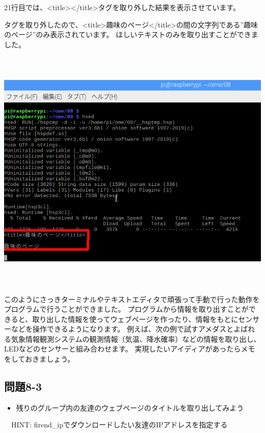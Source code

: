 \documentclass[a4paper,12pt,dvipdfmx]{jarticle}
\begin{document}
\bigskip

21行目では、{\textless}title{\textgreater}{\textless}/title{\textgreater}タグを取り外した結果を表示させています。

タグを取り外したので、{\textless}title{\textgreater}趣味のページ{\textless}/title{\textgreater}の間の文字列である”趣味のページ”のみ表示されています。
ほしいテキストのみを取り出すことができました。



\begin{center}
\includegraphics[width=15.411cm,height=11.841cm]{textbook-img015.png}

\end{center}

\bigskip


\bigskip


\bigskip

このようにさっきターミナルやテキストエディタで頑張って手動で行った動作をプログラムで行うことができました。
プログラムから情報を取り出すことができると、取り出した情報を使ってウェブページを作ったり、情報をもとにセンサーなどを操作できるようになります。
例えば、次の例で試すアメダスとよばれる気象情報観測システムの観測情報（気温、降水確率）などの情報を取り出し、LEDなどのセンサーと組み合わせます。
実現したいアイディアがあったらメモをしておきましょう。

\clearpage\subsection*{問題8-3}
\begin{itemize}
\item
残りのグループ内の友達のウェブページのタイトルを取り出してみよう
\end{itemize}
\ \ HINT:
firend\_ipでダウンロードしたい友達のIPアドレスを指定する
\end{document}
